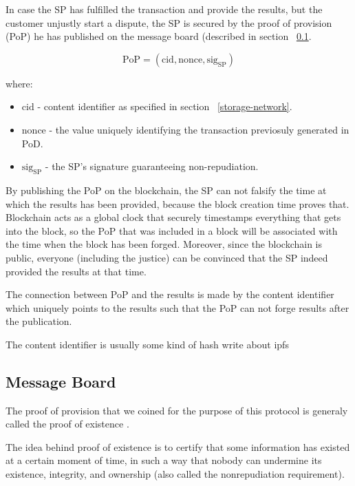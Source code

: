 \documentclass{ieeeaccess}
\begin{document}
In case the SP has fulfilled the transaction and provide the results,
but the customer unjustly start a dispute, the SP is secured by the
proof of provision (PoP) he has published on the message board (described in section ~\ref{message-board}.

\[\mathrm{PoP} = (\mathrm{cid}, \mathrm{nonce}, \mathrm{sig}_\mathrm{SP})\]

where:

\begin{itemize}

\item
  \(\mathrm{cid}\) - content identifier as specified in section ~\ref{storage-network}.
\item
  \(\mathrm{nonce}\) - the value uniquely identifying the transaction
  previosuly generated in PoD.
\item
  \(\mathrm{sig}_\mathrm{SP}\) - the SP's signature guaranteeing
  non-repudiation.
\end{itemize}

By publishing the PoP on the blockchain, the SP can not falsify the time
at which the results has been provided, because the block creation time
proves that. Blockchain acts as a global clock that securely timestamps
everything that gets into the block, so the PoP that was included in a
block will be associated with the time when the block has been forged.
Moreover, since the blockchain is public, everyone (including the
justice) can be convinced that the SP indeed provided the results at
that time.

The connection between PoP and the results is made by the content
identifier which uniquely points to the results such that the PoP can
not forge results after the publication.

The content identifier is usually some kind of hash write about ipfs

\subsection{Message Board}\label{message-board}
The proof of provision that we coined for the purpose of this protocol
is generaly called the proof of existence
\cite{proofofexistence, de2016stampery, Chainpoi39}.

The idea behind proof of existence is to certify that some information
has existed at a certain moment of time, in such a way that nobody can
undermine its existence, integrity, and ownership (also called the
nonrepudiation requirement).
\end{document}
